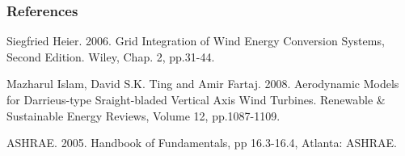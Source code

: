 \subsubsection{References}\label{references-1-009}

Siegfried Heier. 2006. Grid Integration of Wind Energy Conversion Systems, Second Edition. Wiley, Chap. 2, pp.31-44.

Mazharul Islam, David S.K. Ting and Amir Fartaj. 2008. Aerodynamic Models for Darrieus-type Sraight-bladed Vertical Axis Wind Turbines. Renewable \& Sustainable Energy Reviews, Volume 12, pp.1087-1109.

ASHRAE. 2005. Handbook of Fundamentals, pp 16.3-16.4, Atlanta: ASHRAE.
